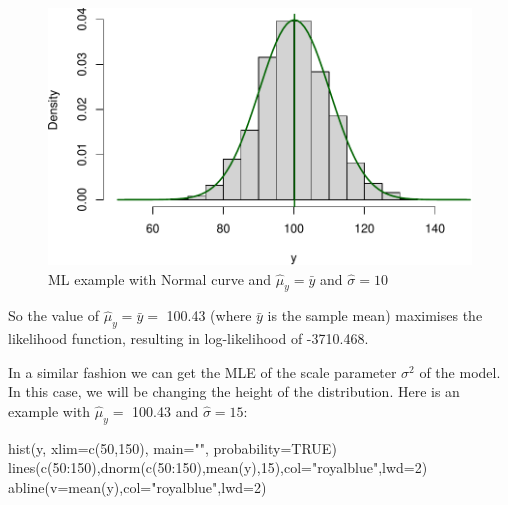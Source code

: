 \documentclass[
]{book}
\newenvironment{Shaded}{\begin{snugshade}}{\end{snugshade}}
\newcommand{\AttributeTok}[1]{\textcolor[rgb]{0.77,0.63,0.00}{#1}}
\newcommand{\ConstantTok}[1]{\textcolor[rgb]{0.00,0.00,0.00}{#1}}
\newcommand{\DecValTok}[1]{\textcolor[rgb]{0.00,0.00,0.81}{#1}}
\newcommand{\FunctionTok}[1]{\textcolor[rgb]{0.00,0.00,0.00}{#1}}
\newcommand{\NormalTok}[1]{#1}
\newcommand{\SpecialCharTok}[1]{\textcolor[rgb]{0.00,0.00,0.00}{#1}}
\newcommand{\StringTok}[1]{\textcolor[rgb]{0.31,0.60,0.02}{#1}}
\theoremstyle{definition}
\theoremstyle{definition}
\theoremstyle{definition}
\theoremstyle{definition}
\theoremstyle{remark}
\begin{document}
\begin{figure}
\centering
\includegraphics{Svetunkov---Statistics-for-Business-Analytics_files/figure-latex/MLENormalExample04-1.pdf}
\caption{\label{fig:MLENormalExample04}ML example with Normal curve and \(\hat{\mu}_y=\bar{y}\) and \(\hat{\sigma}=10\)}
\end{figure}

So the value of \(\hat{\mu}_y=\bar{y}=\) 100.43 (where \(\bar{y}\) is the sample mean) maximises the likelihood function, resulting in log-likelihood of -3710.468.

In a similar fashion we can get the MLE of the scale parameter \(\sigma^2\) of the model. In this case, we will be changing the height of the distribution. Here is an example with \(\hat{\mu}_y=\) 100.43 and \(\hat{\sigma}=15\):

\begin{Shaded}
\begin{Highlighting}[]
\FunctionTok{hist}\NormalTok{(y, }\AttributeTok{xlim=}\FunctionTok{c}\NormalTok{(}\DecValTok{50}\NormalTok{,}\DecValTok{150}\NormalTok{), }\AttributeTok{main=}\StringTok{""}\NormalTok{, }\AttributeTok{probability=}\ConstantTok{TRUE}\NormalTok{)}
\FunctionTok{lines}\NormalTok{(}\FunctionTok{c}\NormalTok{(}\DecValTok{50}\SpecialCharTok{:}\DecValTok{150}\NormalTok{),}\FunctionTok{dnorm}\NormalTok{(}\FunctionTok{c}\NormalTok{(}\DecValTok{50}\SpecialCharTok{:}\DecValTok{150}\NormalTok{),}\FunctionTok{mean}\NormalTok{(y),}\DecValTok{15}\NormalTok{),}\AttributeTok{col=}\StringTok{"royalblue"}\NormalTok{,}\AttributeTok{lwd=}\DecValTok{2}\NormalTok{)}
\FunctionTok{abline}\NormalTok{(}\AttributeTok{v=}\FunctionTok{mean}\NormalTok{(y),}\AttributeTok{col=}\StringTok{"royalblue"}\NormalTok{,}\AttributeTok{lwd=}\DecValTok{2}\NormalTok{)}
\end{Highlighting}
\end{Shaded}
\end{document}
